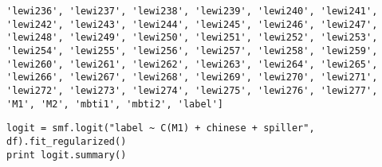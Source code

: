\documentclass[12pt,fleqn]{article}\usepackage{../common}
\begin{document}
\begin{verbatim}
'lewi236', 'lewi237', 'lewi238', 'lewi239', 'lewi240', 'lewi241', 'lewi242', 'lewi243', 'lewi244', 'lewi245', 'lewi246', 'lewi247', 'lewi248', 'lewi249', 'lewi250', 'lewi251', 'lewi252', 'lewi253', 'lewi254', 'lewi255', 'lewi256', 'lewi257', 'lewi258', 'lewi259', 'lewi260', 'lewi261', 'lewi262', 'lewi263', 'lewi264', 'lewi265', 'lewi266', 'lewi267', 'lewi268', 'lewi269', 'lewi270', 'lewi271', 'lewi272', 'lewi273', 'lewi274', 'lewi275', 'lewi276', 'lewi277', 'M1', 'M2', 'mbti1', 'mbti2', 'label']
\end{verbatim}

\begin{verbatim}
logit = smf.logit("label ~ C(M1) + chinese + spiller", df).fit_regularized()
print logit.summary()
\end{verbatim}
\end{document}
